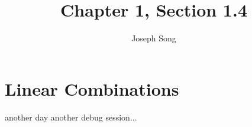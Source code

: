 \documentclass{article}
\title{Chapter 1, Section 1.4}
\author{Joseph Song}
\date{}
\begin{document}
 
\maketitle

\section{Linear Combinations}
another day another debug session...
 
\end{document}
